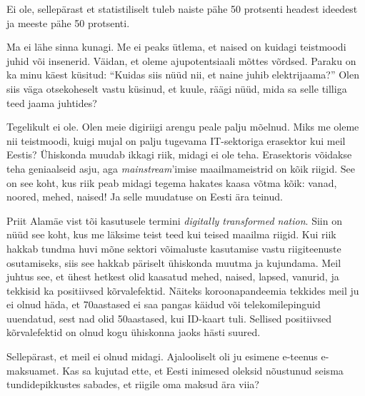 
Ei ole, sellepärast et statistiliselt tuleb naiste pähe 50 protsenti headest 
ideedest ja meeste pähe 50 protsenti.


Ma ei lähe sinna kunagi. Me ei peaks ütlema, 
et naised on kuidagi teistmoodi juhid või insenerid. Väidan, et oleme 
ajupotentsiaali mõttes võrdsed. Paraku on ka minu käest 
küsitud: \enquote{Kuidas siis nüüd nii, et naine juhib elektrijaama?} 
Olen siis väga otsekoheselt vastu küsinud, et kuule, räägi nüüd, 
mida sa selle tilliga teed jaama juhtides? 


Tegelikult ei ole. Olen meie digiriigi arengu peale palju mõelnud. Miks me oleme nii 
teistmoodi, kuigi mujal on palju tugevama IT-sektoriga erasektor kui meil 
Eestis? Ühiskonda muudab ikkagi riik, midagi ei ole teha. 
Erasektoris võidakse teha geniaalseid asju, aga \emph{mainstream}'imise 
maailmameistrid on kõik riigid. See on see koht, kus riik peab midagi 
tegema hakates kaasa võtma kõik: vanad, noored, mehed, naised! Ja 
selle muudatuse on Eesti ära teinud.

Priit Alamäe vist tõi kasutusele termini \emph{digitally transformed nation}. Siin on 
nüüd see koht, kus me läksime teist teed kui teised maailma riigid. Kui 
riik hakkab tundma huvi mõne sektori võimaluste kasutamise vastu 
riigiteenuste osutamiseks, siis see hakkab päriselt ühiskonda muutma 
ja kujundama. Meil juhtus see, et ühest hetkest olid kaasatud 
mehed, naised, lapsed, vanurid, ja tekkisid ka positiivsed kõrvalefektid. Näiteks koroonapandeemia tekkides meil ju ei olnud häda, et 
70aastased ei saa pangas käidud või 
telekomilepinguid uuendatud, sest nad olid 50aastased, kui ID-kaart tuli. Sellised
positiivsed kõrvalefektid on olnud kogu ühiskonna jaoks hästi suured.


Sellepärast, et meil ei olnud midagi. Ajalooliselt oli ju esimene 
e-teenus e-maksuamet. Kas sa kujutad ette, et Eesti inimesed oleksid 
nõustunud seisma tundidepikkustes sabades, et riigile oma maksud ära viia?


